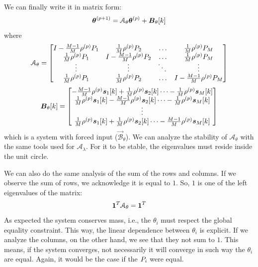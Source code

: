 \documentclass[../main.tex]{subfiles}
\begin{document}
We can finally write it in matrix form:
\begin{equation}
  \label{eq:negotiation_equation_substituting_organizing_matrix_theta}
  \boldsymbol{\theta}^{(p+1)}=\mathcal{A}_{\theta}\boldsymbol{\theta}^{(p)}+\mathcal{\boldsymbol{B}}_{\theta}[k]
\end{equation}
where
\begin{equation}
\mathcal{A}_{\theta}=\left[
\begin{matrix}
I-\frac{M-1}{M}\rho\p \Plin[1] & \frac{1}{M}\rho\p \Plin[2]&\dots&\frac{1}{M}\rho\p \Plin[M]\\
\frac{1}{M}\rho\p \Plin[1]&I-\frac{M-1}{M}\rho\p \Plin[2]&\dots&\frac{1}{M}\rho\p \Plin[M]\\
\vdots&\vdots&\ddots&\vdots\\
\frac{1}{M}\rho\p \Plin[1]&\frac{1}{M}\rho\p \Plin[2]&\dots&I-\frac{M-1}{M}\rho\p \Plin[M]\\
\end{matrix}
\right]
\end{equation}
\begin{equation}
\mathcal{\vec{B}}_{\theta}[k]=\left[
\begin{matrix}
-\frac{M-1}{M}\rho\p \vec{s}_{1}[k]+\frac{1}{M}\rho\p \vec{s}_{2}[k]\dots-\frac{1}{M}\rho\p \vec{s}_{M}[k]\\
\frac{1}{M}\rho\p \vec{s}_{1}[k]-\frac{M-1}{M}\rho\p \vec{s}_{2}[k] \dots-\frac{1}{M}\rho\p \vec{s}_{M}[k]\\
\vdots\\
\frac{1}{M}\rho\p \vec{s}_{1}[k]+\frac{1}{M}\rho\p \vec{s}_{2}[k]\dots-\frac{M-1}{M}\rho\p \vec{s}_{M}[k]\\
\end{matrix}
\right]
\end{equation}
which is a \dt{} system with forced input ($\mathcal{\vec{B}}_{\theta}$).
We can analyze the stability of $\mathcal{A}_{\theta}$ with the same tools used for $\mathcal{A}_{\lambda}$.
For it to be stable, the eigenvalues must reside inside the unit circle.

We can also do the same analysis of the sum of the rows and columns.
If we observe the sum of rows, we acknowledge it is equal to $1$.
So, $1$ is one of the left eigenvalues of the matrix:
\begin{equation}
  \label{eq:1}
  \mathbf{1}^{T}\mathcal{A}_{\theta}=\mathbf{1}^{T}
\end{equation}
As expected the system conserves mass, i.e., the $\theta_{i}$ must respect the global equality constraint.
This way, the linear dependence between $\theta_{i}$ is explicit.
If we analyze the columns, on the other hand, we see that they not sum to $1$.
This means, if the system converges, not necessarily it will converge in such way the $\theta_{i}$ are equal.
Again, it would be the case if the ${P}_{i}$ were equal.
\end{document}
